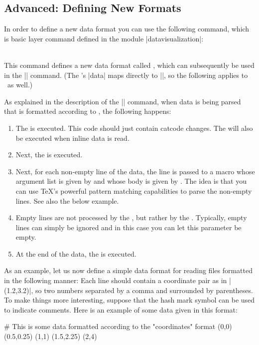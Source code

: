 \subsection{Advanced: Defining New Formats}
\label{section-dv-declaring-formats}

In order to define a new data format you can use the following
command, which is basic layer command defined in the module
|datavisualization|:

\begin{command}{\pgfdeclaredataformat{}\\}
  This command defines a new data format called ,
  which can subsequently be used in the |\pgfdata| command. (The
  \tikzname's |data| maps directly to |\pgfdata|, so the following
  applies to \tikzname\ as well.)

  As explained in the description of the |\pgfdata| command, when data
  is being parsed that is formatted according to ,
  the following happens:
  \begin{enumerate}
  \item The  is executed. This code should just
    contain catcode changes. The  will also be
    executed when inline data is read.
  \item Next, the  is executed.
  \item Next, for each non-empty line of the data, the line is passed
    to a macro whose argument list is given by  and whose body is given by . The idea
    is that you can use \TeX's powerful pattern matching capabilities
    to parse the non-empty lines. See also the below example.
  \item Empty lines are not processed by the , but
    rather by the . Typically, empty lines can
    simply be ignored and in this case you can let this parameter be
    empty.
  \item At the end of the data, the  is executed.
  \end{enumerate}

  As an example, let us now define a simple data format for reading
  files formatted in the following manner: Each line should contain a
  coordinate pair as in |(1.2,3.2)|, so two numbers separated by a
  comma and surrounded by parentheses. To make things more
  interesting, suppose that the hash mark symbol can be used to
  indicate comments. Here is an example of some data given in this
  format:
\begin{codeexample}
# This is some data formatted according to the "coordinates" format
(0,0)
(0.5,0.25)
(1,1)
(1.5,2.25)
(2,4)
\end{codeexample}


\end{command}
